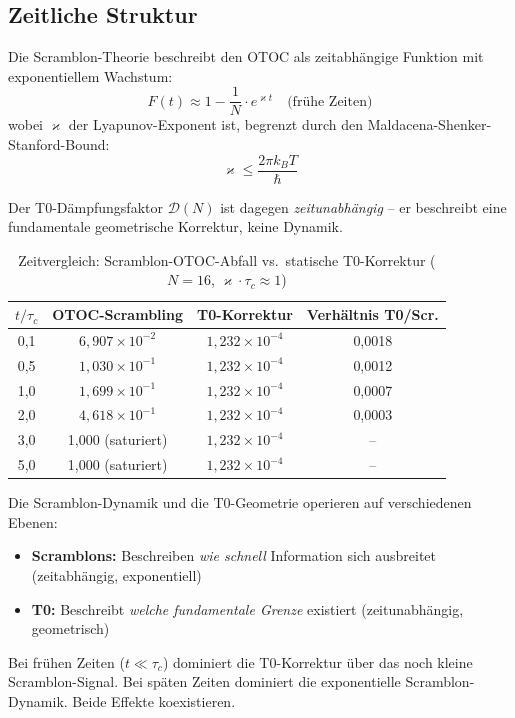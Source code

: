 \subsection{Zeitliche Struktur}

Die Scramblon-Theorie beschreibt den OTOC als zeitabhängige Funktion mit exponentiellem Wachstum:
\begin{equation}
	F(t) \approx 1 - \frac{1}{N} \cdot e^{\varkappa t} \quad \text{(frühe Zeiten)}
	\label{eq:otoc_scrambling}
\end{equation}
wobei $\varkappa$ der Lyapunov-Exponent ist, begrenzt durch den Maldacena-Shenker-Stanford-Bound:
\begin{equation}
	\varkappa \leq \frac{2\pi k_B T}{\hbar}
\end{equation}

Der T0-Dämpfungsfaktor $\mathcal{D}(N)$ ist dagegen \emph{zeitunabhängig} -- er beschreibt eine fundamentale geometrische Korrektur, keine Dynamik.

\begin{table}[h]
	\centering
	\caption{Zeitvergleich: Scramblon-OTOC-Abfall vs.\ statische T0-Korrektur ($N=16$, $\varkappa \cdot \tau_c \approx 1$)}
	\label{tab:time_comparison}
	\begin{tabular}{@{}cccc@{}}
		\toprule
		$t/\tau_c$ & OTOC-Scrambling & T0-Korrektur & Verhältnis T0/Scr. \\
		\midrule
		0,1 & $6{,}907 \times 10^{-2}$ & $1{,}232 \times 10^{-4}$ & 0,0018 \\
		0,5 & $1{,}030 \times 10^{-1}$ & $1{,}232 \times 10^{-4}$ & 0,0012 \\
		1,0 & $1{,}699 \times 10^{-1}$ & $1{,}232 \times 10^{-4}$ & 0,0007 \\
		2,0 & $4{,}618 \times 10^{-1}$ & $1{,}232 \times 10^{-4}$ & 0,0003 \\
		3,0 & 1,000 (saturiert) & $1{,}232 \times 10^{-4}$ & -- \\
		5,0 & 1,000 (saturiert) & $1{,}232 \times 10^{-4}$ & -- \\
		\bottomrule
	\end{tabular}
\end{table}

\begin{remark}[Komplementarität]
	Die Scramblon-Dynamik und die T0-Geometrie operieren auf verschiedenen Ebenen:
	\begin{itemize}
		\item \textbf{Scramblons:} Beschreiben \emph{wie schnell} Information sich ausbreitet (zeitabhängig, exponentiell)
		\item \textbf{T0:} Beschreibt \emph{welche fundamentale Grenze} existiert (zeitunabhängig, geometrisch)
	\end{itemize}
	Bei frühen Zeiten ($t \ll \tau_c$) dominiert die T0-Korrektur über das noch kleine Scramblon-Signal. Bei späten Zeiten dominiert die exponentielle Scramblon-Dynamik. Beide Effekte koexistieren.
\end{remark}

